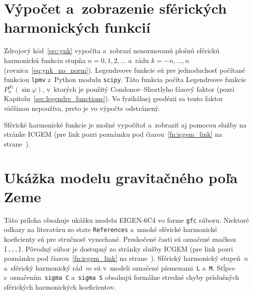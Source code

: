 \documentclass[a4paper, 12pt]{book}
\begin{document}
\chapter{Výpočet a~zobrazenie sférických harmonických funkcií}
\label{app:sh}

Zdrojový kód~\ref{src:ynk} vypočíta a~zobrazí nenormovanú plošnú sférickú
harmonickú funkciu stupňa $n = 0, 1, 2, \dots$ a~rádu $k = -n, \dots, n$
(rovnica~\ref{eq:ynk_no_norm}).  Legendreove funkcie sú pre jednoduchosť
počítané funkciou \texttt{lpmv} z~Python modulu \texttt{scipy}.  Táto funkcia
počíta Legendreove funkcie $P_n^{|k|}(\sin\varphi)$, v~ktorých je
použitý Condonov--Shortlyho fázový faktor (pozri 
Kapitolu~\ref{sec:legendre_functions}).  Vo fyzikálnej geodézii sa tento faktor 
väčšinou nepoužíva, preto je vo výpočte odstránený.

Sférické harmonické funkcie je možné vypočítať a~zobraziť aj pomocou služby na 
stránke ICGEM (pre link pozri poznámku pod čiarou~\ref{fn:icgem_link} na 
strane~\pageref{fn:icgem_link}).

\vspace{4ex}








\chapter{Ukážka modelu gravitačného poľa Zeme}
\label{app:gfc_file}

Táto príloha obsahuje ukážku modelu EIGEN-6C4 vo forme \texttt{gfc} súboru.  
Niektoré odkazy na literatúru zo state \texttt{References} a~mnohé sférické 
harmonické koeficienty sú pre stručnosť vynechané.  Preskočené časti sú 
označené značkou \texttt{[...]}.  Pôvodný súbor je dostupný zo stránky služby 
ICGEM (pre link pozri poznámku pod čiarou~\ref{fn:icgem_link} na 
strane~\pageref{fn:icgem_link}).  Sférický harmonický stupeň~$n$ a~sférický 
harmonický rád~$m$ sú v~modeli označené písmenami~\texttt{L} a~\texttt{M}.  
Stĺpce s~označením~\texttt{sigma C} a~\texttt{sigma S} obsahujú formálne 
stredné chyby príslušných sférických harmonických koeficientov.

\vspace{10ex}
\footnotesize
\end{document}
